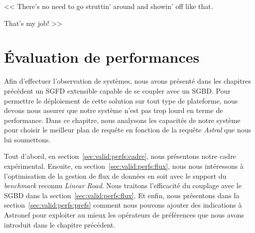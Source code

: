 \begin{savequote}[6cm]
<< There's no need to go struttin' around and showin' off like that. 

\quad That's my job! >>
\end{savequote}

\chapter{Évaluation de performances}\label{chap:valid:perfs}
\chaptertoc

Afin d'effectuer l'observation de systèmes, nous avons présenté dans les chapitres précédent un SGFD extensible capable de se coupler avec un SGBD. Pour permettre le déploiement de cette solution sur tout type de plateforme, nous devons nous assurer que notre système n'est pas trop lourd en terme de performance. Dans ce chapitre, nous analysons les capacités de notre système pour choisir le meilleur plan de requête en fonction de la requête \textit{Astral} que nous lui soumettons.

Tout d'abord, en section~\ref{sec:valid:perfs:cadre}, nous présentons notre cadre expérimental. Ensuite, en section~\ref{sec:valid:perfs:flux}, nous nous intéressons à l'optimisation de la gestion de flux de données en soit avec le support du \textit{benchmark} reconnu \textit{Linear Road}. Nous traitons l'efficacité du couplage avec le SGBD dans la section~\ref{sec:valid:perfs:flux}. Et enfin, nous présentons dans la section~\ref{sec:valid:perfs:prefs} comment nous pouvons ajouter des indications à Astronef pour exploiter au mieux les opérateurs de préférences que nous avons introduit dans le chapitre précédent.






